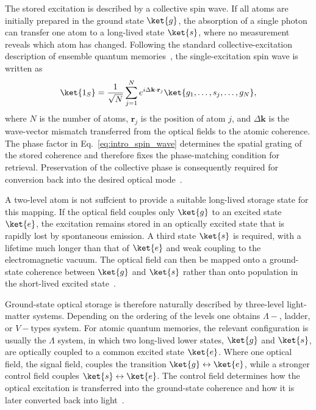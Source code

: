 The stored excitation is described by a collective spin wave. If all atoms are initially prepared in the ground state $\ket{g}$, the absorption of a single photon can transfer one atom to a long-lived state $\ket{s}$, where no measurement reveals which atom has changed. Following the standard collective-excitation description of ensemble quantum memories~\cite{AWAVQMitCoSR_Rodriguez_,Oqmboeit_MaEtAl_2017}, the single-excitation spin wave is written as
\begin{equation}
    \ket{1_S}
    =
    \frac{1}{\sqrt{N}}
    \sum_{j=1}^{N}
    e^{i\Delta\mathbf{k}\cdot\mathbf{r}_j}
    \ket{g_1,\ldots,s_j,\ldots,g_N},
    \label{eq:intro_spin_wave}
\end{equation}
where $N$ is the number of atoms, $\mathbf{r}_j$ is the position of atom $j$, and $\Delta\mathbf{k}$ is the wave-vector mismatch transferred from the optical fields to the atomic coherence. The phase factor in Eq.~\eqref{eq:intro_spin_wave} determines the spatial grating of the stored coherence and therefore fixes the phase-matching condition for retrieval. Preservation of the collective phase is consequently required for conversion back into the desired optical mode~\cite{AWAVQMitCoSR_Rodriguez_,Oqmboeit_MaEtAl_2017}.

A two-level atom is not suffcient to provide a suitable long-lived storage state for this mapping. If the optical field couples only $\ket{g}$ to an excited state $\ket{e}$, the excitation remains stored in an optically excited state that is rapidly lost by spontaneous emission. A third state $\ket{s}$ is required, with a lifetime much longer than that of $\ket{e}$ and weak coupling to the electromagnetic vacuum. The optical field can then be mapped onto a ground-state coherence between $\ket{g}$ and $\ket{s}$ rather than onto population in the short-lived excited state~\cite{AWAVQMitCoSR_Rodriguez_,Oqmboeit_MaEtAl_2017}.

Ground-state optical storage is therefore naturally described by three-level light-matter systems. Depending on the ordering of the levels one obtains $\Lambda-$, ladder, or $V-$types system. For atomic quantum memories, the relevant configuration is usually the $\Lambda$ system, in which two long-lived lower states, $\ket{g}$ and $\ket{s}$, are optically coupled to a common excited state $\ket{e}$. Where one optical field, the signal field, couples the transition $\ket{g}\leftrightarrow\ket{e}$, while a stronger control field couples $\ket{s}\leftrightarrow\ket{e}$. The control field determines how the optical excitation is transferred into the ground-state coherence and how it is later converted back into light~\cite{Oqmboeit_MaEtAl_2017,Apgteitiav_FinkelsteinEtAl_2023}.

